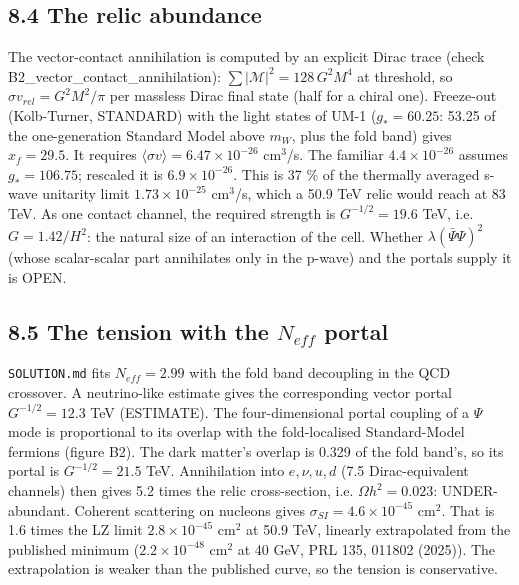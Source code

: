 \documentclass[11pt]{article}
\begin{document}
\subsection*{8.4 The relic abundance}

The vector-contact annihilation is computed by an explicit Dirac trace (check B2\_vector\_contact\_annihilation): $\sum|\mathcal M|^2 = 128\,G^2M^4$ at threshold, so $\sigma v_{rel} = G^2M^2/\pi$ per massless Dirac final state (half for a chiral one). Freeze-out (Kolb-Turner, STANDARD) with the light states of UM-1 ($g_* = 60.25$: 53.25 of the one-generation Standard Model above $m_W$, plus the fold band) gives $x_f = 29.5$. It requires $\langle\sigma v\rangle = 6.47\times10^{-26}$ cm$^3$/s. The familiar $4.4\times10^{-26}$ assumes $g_* = 106.75$; rescaled it is $6.9\times10^{-26}$. This is 37 \% of the thermally averaged s-wave unitarity limit $1.73\times10^{-25}$ cm$^3$/s, which a 50.9 TeV relic would reach at 83 TeV. As one contact channel, the required strength is $G^{-1/2} = 19.6$ TeV, i.e. $G = 1.42/H^2$: the natural size of an interaction of the cell. Whether $\lambda(\bar\Psi\Psi)^2$ (whose scalar-scalar part annihilates only in the p-wave) and the portals supply it is OPEN.

\subsection*{8.5 The tension with the $N_{eff}$ portal}

\texttt{SOLUTION.\allowbreak{}md} fits $N_{eff} = 2.99$ with the fold band decoupling in the QCD crossover. A neutrino-like estimate gives the corresponding vector portal $G^{-1/2} = 12.3$ TeV (ESTIMATE). The four-dimensional portal coupling of a $\Psi$ mode is proportional to its overlap with the fold-localised Standard-Model fermions (figure B2). The dark matter's overlap is 0.329 of the fold band's, so its portal is $G^{-1/2} = 21.5$ TeV. Annihilation into $e, \nu, u, d$ (7.5 Dirac-equivalent channels) then gives 5.2 times the relic cross-section, i.e. $\Omega h^2 = 0.023$: UNDER-abundant. Coherent scattering on nucleons gives $\sigma_{SI} = 4.6\times10^{-45}$ cm$^2$. That is 1.6 times the LZ limit $2.8\times10^{-45}$ cm$^2$ at 50.9 TeV, linearly extrapolated from the published minimum ($2.2\times10^{-48}$ cm$^2$ at 40 GeV, PRL 135, 011802 (2025)). The extrapolation is weaker than the published curve, so the tension is conservative.
\end{document}
